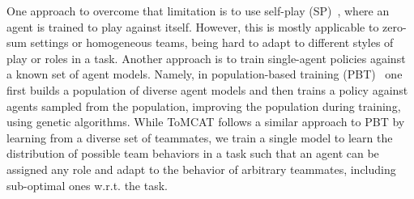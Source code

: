 
One approach to overcome that limitation is to use self-play (SP)~\citep{silver2017mastering}, where an agent is trained to play against itself. However, this is mostly applicable to zero-sum settings or homogeneous teams, being hard to adapt to different styles of play or roles in a task. Another approach is to train single-agent policies against a known set of agent models. Namely, in population-based training (PBT)~\citep{jaderberg2019human} one first builds a population of diverse agent models and then trains a policy against agents sampled from the population, improving the population during training, \eg using genetic algorithms. %
While ToMCAT follows a similar approach to PBT by learning from a diverse set of teammates, we 
train a single model to learn the distribution of possible team behaviors in a task such that an agent can be assigned any role and adapt to the behavior of arbitrary teammates, including sub-optimal ones w.r.t. the task.

